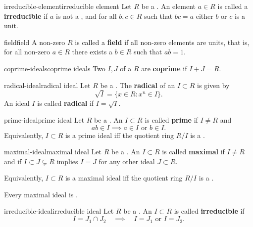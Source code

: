 \begin{topic}{irreducible-element}{irreducible element}
    Let $R$ be a . An element $a \in R$ is called a \textbf{irreducible} if $a$ is not a , and for all $b, c \in R$ such that $bc = a$ either $b$ or $c$ is a unit.
\end{topic}

\begin{topic}{field}{field}
    A non-zero  $R$ is called a \textbf{field} if all non-zero elements are units, that is, for all non-zero $a \in R$ there exists a $b \in R$ such that $ab = 1$. 
\end{topic}

\begin{topic}{coprime-ideals}{coprime ideals}
    Two  $I, J$ of a  $R$ are \textbf{coprime} if $I + J = R$.
\end{topic}

\begin{topic}{radical-ideal}{radical ideal}
    Let $R$ be a . The \textbf{radical} of an  $I \subset R$ is given by
    \[ \sqrt{I} = \{ x \in R : x^n \in I \} . \]
    An ideal $I$ is called \textbf{radical} if $I = \sqrt{I}$.
\end{topic}

\begin{topic}{prime-ideal}{prime ideal}
    Let $R$ be a . An  $I \subset R$ is called \textbf{prime} if $I \ne R$ and
    \[ ab \in I \implies a \in I \text{ or } b \in I . \]
    Equivalently, $I \subset R$ is a prime ideal iff the quotient ring $R / I$ is a .
\end{topic}

\begin{topic}{maximal-ideal}{maximal ideal}
    Let $R$ be a . An  $I \subset R$ is called \textbf{maximal} if $I \ne R$ and if $I \subset J \subsetneq R$ implies $I = J$ for any other ideal $J \subset R$.
    
    Equivalently, $I \subset R$ is a maximal ideal iff the quotient ring $R / I$ is a .
    
    Every maximal ideal is .
\end{topic}

\begin{topic}{irreducible-ideal}{irreducible ideal}
    Let $R$ be a . An  $I \subset R$ is called \textbf{irreducible} if
    \[ I = J_1 \cap J_2 \quad \implies \quad I = J_1 \text{ or } I = J_2 . \]
\end{topic}

